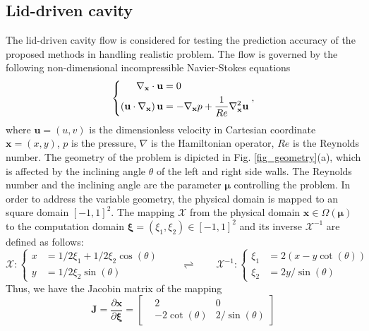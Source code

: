 \documentclass[preprint, 10pt]{elsarticle}
\begin{document}
\subsection{Lid-driven cavity}
The lid-driven cavity flow is considered for testing the prediction accuracy of the proposed methods in handling realistic problem.
The flow is governed by the following non-dimensional incompressible Navier-Stokes equations
\begin{equation}
\left \{
\begin{aligned}
\nabla_{\mathbf{x}}  \cdot {\bf{u}} &= 0 \\
\left( {{\bf{u}} \cdot \nabla_{\mathbf{x}} } \right){\bf{u}} &=  - \nabla_{\mathbf{x}} p + \frac{1}{Re}{\nabla_{\mathbf{x}} ^2}{\bf{u}}
\end{aligned}
\right .
,
\label{eq_GoverningEqsLidDriven}
\end{equation}
where $\mathbf{u}=(u,v)$ is the dimensionless velocity in Cartesian coordinate $\mathbf{x}=(x,y)$, $p$ is the pressure, $\nabla$ is the  Hamiltonian operator, $Re$ is the Reynolds number.  The geometry of the problem is dipicted in Fig. \ref{fig_geometry}(a), which is affected by  the inclining angle $\theta$ of the left and right side walls. The Reynolds number and the inclining angle are the parameter $\pmb {\mu} $ controlling the problem. In order to address the variable geometry, the physical domain  is mapped to an square domain $[-1,1]^2$. The mapping $\mathcal{X}$ from the physical domain $\mathbf{x} \in \Omega\left(\pmb{\mu}\right)$ to the computation domain $\pmb{ \xi}=(\xi_1, \xi_2) \in [-1,1]^2$  and its inverse $\mathcal{X}^{-1}$ are defined as follows:
\begin{equation}
\mathcal{X}:
\left \{
\begin{aligned}
x &= 1/2 \xi_1 + 1/2 \xi_2 \cos(\theta)\\
y &= 1/2 \xi_2 \sin(\theta)
\end{aligned}
\right .
\qquad
\rightleftharpoons
\qquad
\mathcal{X}^{-1}:
\left \{
\begin{aligned}
\xi_1 &= 2(x-y \cot(\theta))\\
\xi_2 &= 2y/\sin(\theta)
\end{aligned}
\right .
\end{equation}
Thus, we have the Jacobin matrix of the mapping
\begin{equation}
\mathbf{J} = \frac{\partial \mathbf{x}}{\partial \pmb{\xi}}
           =
\begin{bmatrix}
 &2             & 0\\
 &-2\cot(\theta)&2/\sin(\theta)
\end{bmatrix}
\label{eq_JacLidDriven}
\end{equation}
\end{document}
